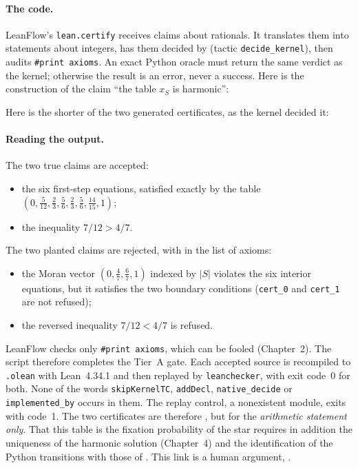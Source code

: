 \paragraph{The code.} LeanFlow's \texttt{lean.certify} receives claims about rationals. It translates them into
statements about integers, has them decided by  (tactic \texttt{decide\_kernel}), then audits
\texttt{\#print axioms}. An exact Python oracle must return the same verdict as the kernel; otherwise the result is an
error, never a success. Here is the construction of the claim ``the table $x_S$ is harmonic'':

Here is the shorter of the two generated certificates, as the kernel decided it:


\paragraph{Reading the output.} The two true claims are accepted:
\begin{itemize}
\item the six first-step equations, satisfied exactly by the table $(0,\tfrac5{12},\tfrac23,\tfrac56,
\tfrac23,\tfrac56,\tfrac{14}{15},1)$;
\item the inequality $7/12>4/7$.
\end{itemize}
The two planted claims are rejected, with  in the list of axioms:
\begin{itemize}
\item the Moran vector $(0,\tfrac47,\tfrac67,1)$ indexed by $|S|$ violates the six interior equations, but it satisfies
the two boundary conditions (\texttt{cert\_0} and \texttt{cert\_1} are not refused);
\item the reversed inequality $7/12<4/7$ is refused.
\end{itemize}
LeanFlow checks only \texttt{\#print axioms}, which can be fooled (Chapter~2). The script therefore completes the Tier~A
gate. Each accepted source is recompiled to \texttt{.olean} with Lean~4.34.1 and then replayed by \texttt{leanchecker},
with exit code~0 for both. None of the words \texttt{skipKernelTC}, \texttt{addDecl}, \texttt{native\_decide} or
\texttt{implemented\_by} occurs in them. The replay control, a nonexistent module, exits with code~1. The two
certificates are therefore \tierA, but for the \emph{arithmetic statement only}. That this table is the fixation
probability of the star requires in addition the uniqueness of the harmonic solution (Chapter~4) and the identification
of the Python transitions with those of . This link is a human argument, \tierC.

